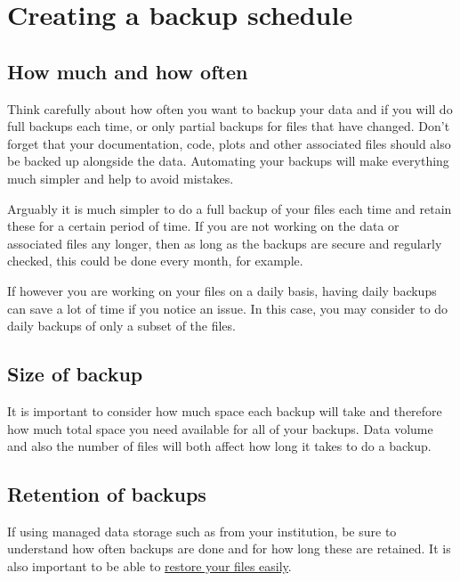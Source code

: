 \documentclass[a4paper,oneside]{report}
\begin{document}
\hypertarget{creating-a-backup-schedule}{%
\section{Creating a backup schedule}\label{creating-a-backup-schedule}}

\hypertarget{how-much-and-how-often}{%
\subsection{How much and how often}\label{how-much-and-how-often}}

Think carefully about how often you want to backup your data and if you
will do full backups each time, or only partial backups for files that
have changed. Don't forget that your documentation, code, plots and
other associated files should also be backed up alongside the data.
Automating your backups will make everything much simpler and help to
avoid mistakes.

Arguably it is much simpler to do a full backup of your files each time
and retain these for a certain period of time. If you are not working on
the data or associated files any longer, then as long as the backups are
secure and regularly checked, this could be done every month, for
example.

If however you are working on your files on a daily basis, having daily
backups can save a lot of time if you notice an issue. In this case, you
may consider to do daily backups of only a subset of the files.

\hypertarget{size-of-backup}{%
\subsection{Size of backup}\label{size-of-backup}}

It is important to consider how much space each backup will take and
therefore how much total space you need available for all of your
backups. Data volume and also the number of files will both affect how
long it takes to do a backup.

\hypertarget{retention-of-backups}{%
\subsection{Retention of backups}\label{retention-of-backups}}

If using managed data storage such as from your institution, be sure to
understand how often backups are done and for how long these are
retained. It is also important to be able to
\protect\hyperlink{file-restoration}{restore your files easily}.
\end{document}
